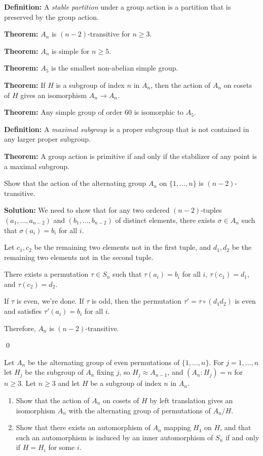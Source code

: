 \textbf{Definition:} A \textit{stable partition} under a group action is a partition that is preserved by the group action.

\textbf{Theorem:} $A_n$ is $(n-2)$-transitive for $n \geq 3$.

\textbf{Theorem:} $A_n$ is simple for $n \geq 5$.

\textbf{Theorem:} $A_5$ is the smallest non-abelian simple group.

\textbf{Theorem:} If $H$ is a subgroup of index $n$ in $A_n$, then the action of $A_n$ on cosets of $H$ gives an isomorphism $A_n \to A_n$.

\textbf{Theorem:} Any simple group of order 60 is isomorphic to $A_5$.

\textbf{Definition:} A \textit{maximal subgroup} is a proper subgroup that is not contained in any larger proper subgroup.

\textbf{Theorem:} A group action is primitive if and only if the stabilizer of any point is a maximal subgroup.

\begin{problembox}
Show that the action of the alternating group $A_n$ on $\{1, \ldots, n\}$ is $(n - 2)$-transitive.
\end{problembox}

\noindent\textbf{Solution:} We need to show that for any two ordered $(n-2)$-tuples $(a_1, \ldots, a_{n-2})$ and $(b_1, \ldots, b_{n-2})$ of distinct elements, there exists $\sigma \in A_n$ such that $\sigma(a_i) = b_i$ for all $i$.

Let $c_1, c_2$ be the remaining two elements not in the first tuple, and $d_1, d_2$ be the remaining two elements not in the second tuple.

There exists a permutation $\tau \in S_n$ such that $\tau(a_i) = b_i$ for all $i$, $\tau(c_1) = d_1$, and $\tau(c_2) = d_2$.

If $\tau$ is even, we're done. If $\tau$ is odd, then the permutation $\tau' = \tau \circ (d_1 d_2)$ is even and satisfies $\tau'(a_i) = b_i$ for all $i$.

Therefore, $A_n$ is $(n-2)$-transitive.


\qed
\begin{problembox}
Let $A_n$ be the alternating group of even permutations of $\{1, \ldots, n\}$. For $j = 1, \ldots, n$ let $H_j$ be the subgroup of $A_n$ fixing $j$, so $H_j \approx A_{n-1}$, and $(A_n : H_j) = n$ for $n \geq 3$. Let $n \geq 3$ and let $H$ be a subgroup of index $n$ in $A_n$.
\begin{enumerate}[label=(\alph*)]
\item Show that the action of $A_n$ on cosets of $H$ by left translation gives an isomorphism $A_n$ with the alternating group of permutations of $A_n/H$.
\item Show that there exists an automorphism of $A_n$ mapping $H_1$ on $H$, and that such an automorphism is induced by an inner automorphism of $S_n$ if and only if $H = H_i$ for some $i$.
\end{enumerate}
\end{problembox}

